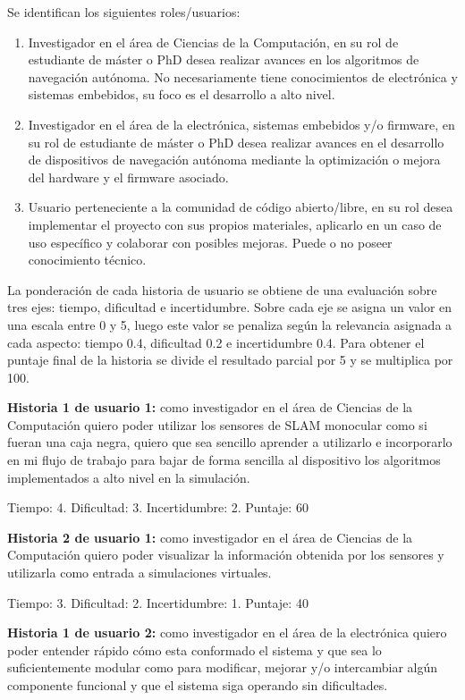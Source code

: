 \documentclass[
11pt, %
codirector, %
]{charter}
\begin{document}
Se identifican los siguientes roles/usuarios:
\begin{enumerate}
	\item Investigador en el área de Ciencias de la Computación, en su rol de estudiante de máster o PhD desea realizar avances en los algoritmos de navegación autónoma. No necesariamente tiene conocimientos de electrónica y sistemas embebidos, su foco es el desarrollo a alto nivel.
	\item Investigador en el área de la electrónica, sistemas embebidos y/o firmware, en su rol de estudiante de máster o PhD desea realizar avances en el desarrollo de dispositivos de navegación autónoma mediante la optimización o mejora del hardware y el firmware asociado.
	\item Usuario perteneciente a la comunidad de código abierto/libre, en su rol desea implementar el proyecto con sus propios materiales, aplicarlo en un caso de uso específico y colaborar con posibles mejoras. Puede o no poseer conocimiento técnico.
\end{enumerate}

La ponderación de cada historia de usuario se obtiene de una evaluación sobre tres ejes: tiempo, dificultad e incertidumbre. Sobre cada eje se asigna un valor en una escala entre 0 y 5, luego este valor se penaliza según la relevancia asignada a cada aspecto: tiempo 0.4, dificultad 0.2 e incertidumbre 0.4. Para obtener el puntaje final de la historia se divide el resultado parcial por 5 y se multiplica por 100.

\textbf{Historia 1 de usuario 1:} como investigador en el área de Ciencias de la Computación quiero poder utilizar los sensores de SLAM monocular como si fueran una caja negra, quiero que sea sencillo aprender a utilizarlo e incorporarlo en mi flujo de trabajo para bajar de forma sencilla al dispositivo los algoritmos implementados a alto nivel en la simulación.

Tiempo: 4. Dificultad: 3. Incertidumbre: 2. Puntaje: 60 

\textbf{Historia 2 de usuario 1:} como investigador en el área de Ciencias de la Computación quiero poder visualizar la información obtenida por los sensores y utilizarla como entrada a simulaciones virtuales.

Tiempo: 3. Dificultad: 2. Incertidumbre: 1. Puntaje: 40 

\textbf{Historia 1 de usuario 2:} como investigador en el área de la electrónica quiero poder entender rápido cómo esta conformado el sistema y que sea lo suficientemente modular como para modificar, mejorar y/o intercambiar algún componente funcional y que el sistema siga operando sin dificultades.
\end{document}
